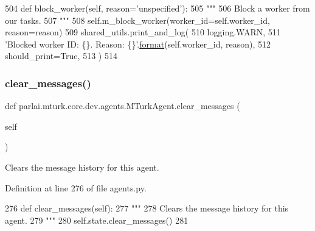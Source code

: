\begin{DoxyCode}
504     \textcolor{keyword}{def }block\_worker(self, reason='unspecified'):
505         \textcolor{stringliteral}{"""}
506 \textcolor{stringliteral}{        Block a worker from our tasks.}
507 \textcolor{stringliteral}{        """}
508         self.m\_block\_worker(worker\_id=self.worker\_id, reason=reason)
509         shared\_utils.print\_and\_log(
510             logging.WARN,
511             \textcolor{stringliteral}{'Blocked worker ID: \{\}. Reason: \{\}'}.\hyperlink{namespaceparlai_1_1chat__service_1_1services_1_1messenger_1_1shared__utils_a32e2e2022b824fbaf80c747160b52a76}{format}(self.worker\_id, reason),
512             should\_print=\textcolor{keyword}{True},
513         )
514 
\end{DoxyCode}
\mbox{\label{classparlai_1_1mturk_1_1core_1_1dev_1_1agents_1_1MTurkAgent_aaf5f9772de3c1f0c0efe0cf2dc98965d}} 
\subsubsection{\texorpdfstring{clear\+\_\+messages()}{clear\_messages()}}
{\footnotesize\ttfamily def parlai.\+mturk.\+core.\+dev.\+agents.\+M\+Turk\+Agent.\+clear\+\_\+messages (\begin{DoxyParamCaption}\item[{}]{self }\end{DoxyParamCaption})}

\begin{DoxyVerb}Clears the message history for this agent.
\end{DoxyVerb}
 

Definition at line 276 of file agents.\+py.


\begin{DoxyCode}
276     \textcolor{keyword}{def }clear\_messages(self):
277         \textcolor{stringliteral}{"""}
278 \textcolor{stringliteral}{        Clears the message history for this agent.}
279 \textcolor{stringliteral}{        """}
280         self.state.clear\_messages()
281 
\end{DoxyCode}
\mbox{\label{classparlai_1_1mturk_1_1core_1_1dev_1_1agents_1_1MTurkAgent_ae41f960fce1595f567e46aca27c654e5}} 
